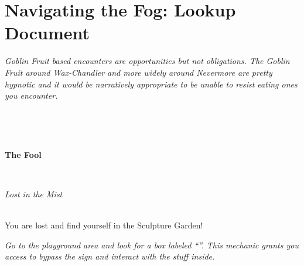 \documentclass[white]{gl2018}
\begin{document}
\name{\wFog{}}

\section*{Navigating the Fog: Lookup Document}
\emph{Goblin Fruit based encounters are opportunities but not obligations. The Goblin Fruit around Wax-Chandler and more widely around Nevermore are pretty hypnotic and it would be narratively appropriate to be unable to resist eating ones you encounter.}
\newcommand{\areastart}[2]{ \begin{huge}{\bf {#1}} \end{huge} \\ \begin{large} \emph{#2} \end{large}\\}
\newcommand{\hobgoblins}[3]{Look!  There!  #1 hobgoblins around a fire...  

\begin{itemize}
\item If you are alone, sneak past.
\item If more than half of your party has lit candles, the hobgoblins flee.
\item If half or fewer of your party has lit candles, fight!  Make #2 Physical checks at #3.  For each failed check, one member of your party with an unlit candle should take one damage.  If more than one member of your party has an unlit candle, you may choose amongst yourselves who takes the damage.
\end{itemize}}
\newenvironment{location}[2]{\begin{minipage}{\textwidth}\areastart{#1}{#2}}{\end{minipage}\vspace{0.3in}}
\newcommand{\lost}[1]{You are lost and find yourself in #1!  That's not where you meant to go....\\{\em Go directly to #1 now.}}
\begin{location}{\hspace{0.5in}}{ }
\end{location}
\begin{location}{The Fool}{Lost in the Mist}
You are lost and find yourself in the Sculpture Garden!

{\em Go to the playground area and look for a box labeled ``\sSculptureGardenWarning{}''.  This mechanic grants you access to bypass the sign and interact with the stuff inside.}
\end{location}
\end{document}
